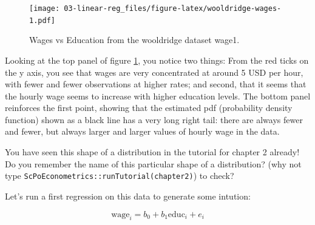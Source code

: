 \documentclass[]{book}
\newenvironment{Shaded}{\begin{snugshade}}{\end{snugshade}}
\newcommand{\KeywordTok}[1]{\textcolor[rgb]{0.13,0.29,0.53}{\textbf{#1}}}
\newcommand{\DataTypeTok}[1]{\textcolor[rgb]{0.13,0.29,0.53}{#1}}
\newcommand{\DecValTok}[1]{\textcolor[rgb]{0.00,0.00,0.81}{#1}}
\newcommand{\StringTok}[1]{\textcolor[rgb]{0.31,0.60,0.02}{#1}}
\newcommand{\CommentTok}[1]{\textcolor[rgb]{0.56,0.35,0.01}{\textit{#1}}}
\newcommand{\OtherTok}[1]{\textcolor[rgb]{0.56,0.35,0.01}{#1}}
\newcommand{\OperatorTok}[1]{\textcolor[rgb]{0.81,0.36,0.00}{\textbf{#1}}}
\newcommand{\NormalTok}[1]{#1}
\newenvironment{warning}{\begin{tcolorbox}[colback=orange!5!white,colframe=orange]}{\end{tcolorbox}}
\begin{document}
\begin{Shaded}
\end{Shaded}

\begin{figure}
\centering
\texttt{[image: 03-linear-reg\_files/figure-latex/wooldridge-wages-1.pdf]}
\caption{\label{fig:wooldridge-wages}Wages vs Education from the wooldridge
dataset wage1.}
\end{figure}

Looking at the top panel of figure \ref{fig:wooldridge-wages}, you
notice two things: From the red ticks on the y axis, you see that wages
are very concentrated at around 5 USD per hour, with fewer and fewer
observations at higher rates; and second, that it seems that the hourly
wage seems to increase with higher education levels. The bottom panel
reinforces the first point, showing that the estimated pdf (probability
density function) shown as a black line has a very long right tail:
there are always fewer and fewer, but always larger and larger values of
hourly wage in the data.

\begin{warning}
You have seen this shape of a distribution in the tutorial for chapter 2
already! Do you remember the name of this particular shape of a
distribution? (why not type
\texttt{ScPoEconometrics::runTutorial(\textquotesingle{}chapter2\textquotesingle{})})
to check?
\end{warning}

Let's run a first regression on this data to generate some intution:

\begin{equation}
\text{wage}_i = b_0 + b_1 \text{educ}_i + e_i \label{eq:wage}
\end{equation}
\end{document}

